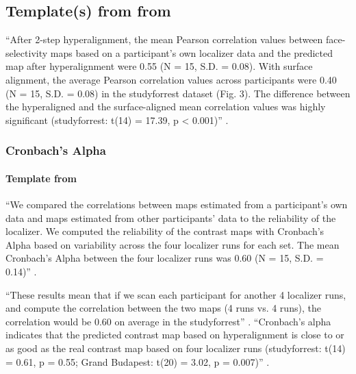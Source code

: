 \subsection{Template(s) from from \citet{jiahui2020predicting}}

%
``After 2-step hyperalignment, the mean Pearson correlation values between
face-selectivity maps based on a participant's own localizer data and the
predicted map after hyperalignment were 0.55 (N = 15, S.D. = 0.08).
%
With surface alignment, the average Pearson correlation values across
participants were 0.40 (N = 15, S.D. = 0.08) in the studyforrest dataset (Fig.
3).
%
The difference between the hyperaligned and the surface-aligned mean correlation
values was highly significant (studyforrest: t(14) = 17.39, p < 0.001)''
\citep{jiahui2020predicting}.



\subsubsection{Cronbach's Alpha}



\paragraph{Template from \citet{jiahui2020predicting}}
%
``We compared the correlations between maps estimated from a participant's own
data and maps estimated from other participants' data to the reliability of the
localizer.
%
We computed the reliability of the contrast maps with Cronbach's Alpha based on
variability across the four localizer runs for each set.
%
The mean Cronbach's Alpha between the four localizer runs was 0.60 (N = 15, S.D.
= 0.14)'' \citep{jiahui2020predicting}.

%
``These results mean that if we scan each participant for another 4 localizer
runs, and compute the correlation between the two maps (4 runs vs. 4 runs), the
correlation would be 0.60 on average in the studyforrest''
\citep{jiahui2020predicting}.
%
``Cronbach's alpha indicates that the predicted contrast map based on
hyperalignment is close to or as good as the real contrast map based on four
localizer runs (studyforrest: t(14) = 0.61, p = 0.55; Grand Budapest: t(20) =
3.02, p = 0.007)'' \citep{jiahui2020predicting}.

